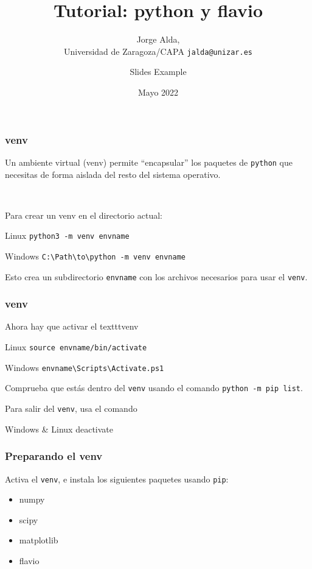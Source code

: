 \documentclass[mathserif, 10pt]{beamer}
\title{Tutorial: python y flavio}
\subtitle{Jorge Alda,\\ Universidad de Zaragoza/CAPA\hspace{4em} \texttt{jalda@unizar.es} }
\author[Jorge Alda]{Slides Example}
\date{Mayo 2022}
\begin{document}
\begin{frame}

    \titlepage

\end{frame}


\begin{frame}\frametitle{venv}
    Un ambiente virtual (venv) permite ``encapsular'' los paquetes de \texttt{python} que necesitas de forma aislada del resto del sistema operativo.

    ~

    Para crear un venv en el directorio actual:
    \begin{block}{Linux}
        \texttt{python3 -m venv envname}
    \end{block}
    \begin{block}{Windows}
        \texttt{C:\textbackslash Path\textbackslash to\textbackslash python -m venv envname}
    \end{block}

    Esto crea un subdirectorio \texttt{envname} con los archivos necesarios para usar el \texttt{venv}.
\end{frame}

\begin{frame}\frametitle{venv}

    Ahora hay que activar el texttt{venv}
    \begin{block}{Linux}
        \texttt{source envname/bin/activate}
    \end{block}
    \begin{block}{Windows}
        \texttt{envname\textbackslash Scripts\textbackslash Activate.ps1}
    \end{block}

    Comprueba que estás dentro del \texttt{venv} usando el comando \texttt{python -m pip list}.

    Para salir del \texttt{venv}, usa el comando
    \begin{block}{Windows \& Linux}
        deactivate
    \end{block}
\end{frame}

\begin{frame}\frametitle{Preparando el venv}
    Activa el \texttt{venv}, e instala los siguientes paquetes usando \texttt{pip}:
    \begin{itemize}
        \item numpy
        \item scipy
        \item matplotlib
        \item flavio
    \end{itemize}
\end{frame}
\end{document}
